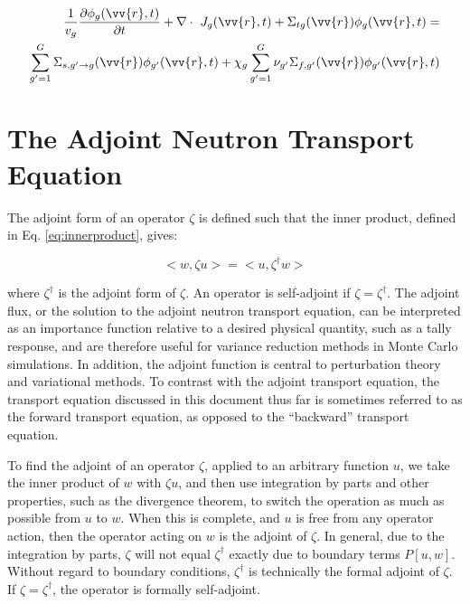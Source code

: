 \documentclass[10pt]{article}
\begin{document}
\begin{flushleft}
\begin{equation}
\label{eq:multigroupTE2}
\begin{aligned}
\frac{1}{v_g} \frac{\partial\phi_g(\vv{r}, t)}{\partial t} + \nabla\cdot\ J_g(\vv{r}, t) + \Sigma_{tg}(\vv{r})\phi_g(\vv{r}, t) =\\
\sum_{g'=1}^{G} \Sigma_{s, g'\rightarrow g}(\vv{r})\phi_{g'}(\vv{r}, t) + \chi_g \sum_{g'=1}^{G} \nu_{g'}\Sigma_{f,g'}(\vv{r})\phi_{g'}(\vv{r}, t)
\end{aligned}
\end{equation}



\clearpage
\section{The Adjoint Neutron Transport Equation}

The adjoint form of an operator \(\zeta\) is defined such that the inner product, defined in Eq. \ref{eq:innerproduct}, gives:

\begin{equation}
\label{eq:AdjointDefinition}
<w, \zeta u> = <u, \zeta^\dagger w>
\end{equation}

where \(\zeta^\dagger\) is the adjoint form of \(\zeta\). An operator is self-adjoint if \(\zeta=\zeta^\dagger\). The adjoint flux, or the solution to the adjoint neutron transport equation, can be interpreted as an importance function relative to a desired physical quantity, such as a tally response, and are therefore useful for variance reduction methods in Monte Carlo simulations. In addition, the adjoint function is central to perturbation theory and variational methods. To contrast with the adjoint transport equation, the transport equation discussed in this document thus far is sometimes referred to as the forward transport equation, as opposed to the ``backward'' transport equation. 

To find the adjoint of an operator \(\zeta\), applied to an arbitrary function \(u\), we take the inner product of \(w\) with \(\zeta u\), and then use integration by parts and other properties, such as the divergence theorem, to switch the operation as much as possible from \(u\) to \(w\). When this is complete, and \(u\) is free from any operator action, then the operator acting on \(w\) is the adjoint of \(\zeta\). In general, due to the integration by parts, \(\zeta\) will not equal \(\zeta^\dagger\) exactly due to boundary terms \(P[u,w]\). Without regard to boundary conditions, \(\zeta^\dagger\) is technically the formal adjoint of \(\zeta\). If \(\zeta=\zeta^\dagger\), the operator is formally self-adjoint.


\end{flushleft}
\end{document}
